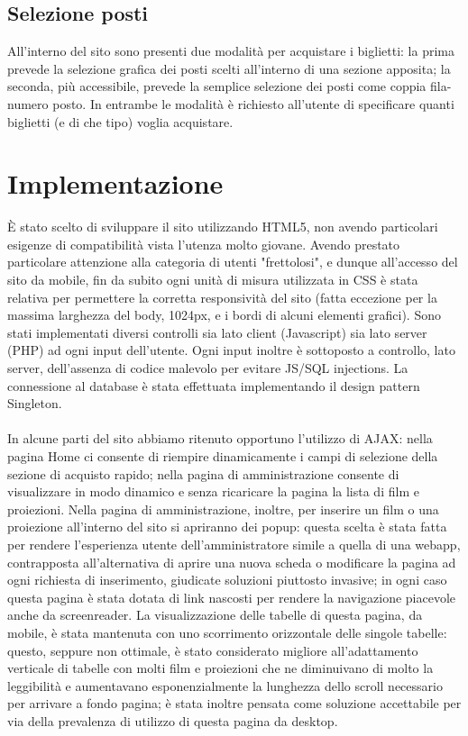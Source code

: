 \documentclass[a4paper, 12pt]{article}
\begin{document}
\subsection{Selezione posti}
All'interno del sito sono presenti due modalità per acquistare i biglietti: la prima prevede la selezione grafica dei posti scelti all'interno di una sezione apposita; la seconda, più accessibile, prevede la semplice selezione dei posti come coppia fila-numero posto. In entrambe le modalità è richiesto all'utente di specificare quanti biglietti (e di che tipo) voglia acquistare.
\section{Implementazione}
È stato scelto di sviluppare il sito utilizzando HTML5, non avendo particolari esigenze di compatibilità vista l'utenza molto giovane.
Avendo prestato particolare attenzione alla categoria di utenti "frettolosi", e dunque all'accesso del sito da mobile, fin da subito ogni unità di misura utilizzata in CSS è stata relativa per permettere la corretta responsività del sito (fatta eccezione per la massima larghezza del body, 1024px, e i bordi di alcuni elementi grafici).
Sono stati implementati diversi controlli sia lato client (Javascript) sia lato server (PHP) ad ogni input dell'utente.
Ogni input inoltre è sottoposto a controllo, lato server, dell'assenza di codice malevolo per evitare JS/SQL injections.
La connessione al database è stata effettuata implementando il design pattern Singleton.\\\\
In alcune parti del sito abbiamo ritenuto opportuno l'utilizzo di AJAX: nella pagina Home ci consente di riempire dinamicamente i campi di selezione della sezione di acquisto rapido; nella pagina di amministrazione consente di visualizzare in modo dinamico e senza ricaricare la pagina la lista di film e proiezioni.
Nella pagina di amministrazione, inoltre, per inserire un film o una proiezione all'interno del sito si apriranno dei popup: questa scelta è stata fatta per rendere l'esperienza utente dell'amministratore simile a quella di una webapp, contrapposta all'alternativa di aprire una nuova scheda o modificare la pagina ad ogni richiesta di inserimento, giudicate soluzioni piuttosto invasive; in ogni caso questa pagina è stata dotata di link nascosti per rendere la navigazione piacevole anche da screenreader. La visualizzazione delle tabelle di questa pagina, da mobile, è stata mantenuta con uno scorrimento orizzontale delle singole tabelle: questo, seppure non ottimale, è stato considerato migliore all'adattamento verticale di tabelle con molti film e proiezioni che ne diminuivano di molto la leggibilità e aumentavano esponenzialmente la lunghezza dello scroll necessario per arrivare a fondo pagina; è stata inoltre pensata come soluzione accettabile per via della prevalenza di utilizzo di questa pagina da desktop.\\\\
\end{document}
